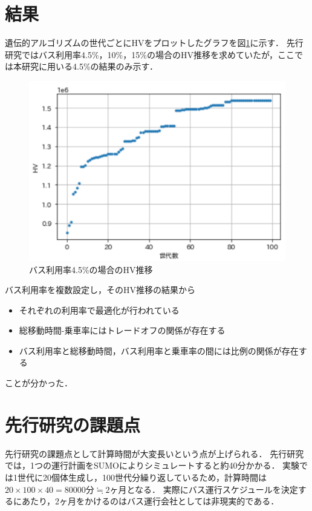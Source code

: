 \documentclass[main]{subfiles}
\begin{document}
    \section{結果}
    遺伝的アルゴリズムの世代ごとにHVをプロットしたグラフを図\ref{hv_plot}に示す．
    先行研究ではバス利用率4.5\%，10\%，15\%の場合のHV推移を求めていたが，ここでは本研究に用いる4.5\%の結果のみ示す．

    \begin{figure}
        \centering
        \includegraphics[width=\linewidth]{figures/hv_plot.png}
        \caption{バス利用率4.5\%の場合のHV推移}
        \label{hv_plot}
    \end{figure}

    バス利用率を複数設定し，そのHV推移の結果から
    \begin{itemize}
        \item それぞれの利用率で最適化が行われている
        \item 総移動時間-乗車率にはトレードオフの関係が存在する
        \item バス利用率と総移動時間，バス利用率と乗車率の間には比例の関係が存在する
    \end{itemize}
    ことが分かった．

    \section{先行研究の課題点}
    先行研究の課題点として計算時間が大変長いという点が上げられる．
    先行研究では，1つの運行計画をSUMOによりシミュレートすると約40分かかる．
    実験では1世代に20個体生成し，100世代分繰り返しているため，計算時間は$20\times 100\times 40 = 80000分 \fallingdotseq 2ヶ月$となる．
    実際にバス運行スケジュールを決定するにあたり，2ヶ月をかけるのはバス運行会社としては非現実的である．
\end{document}

